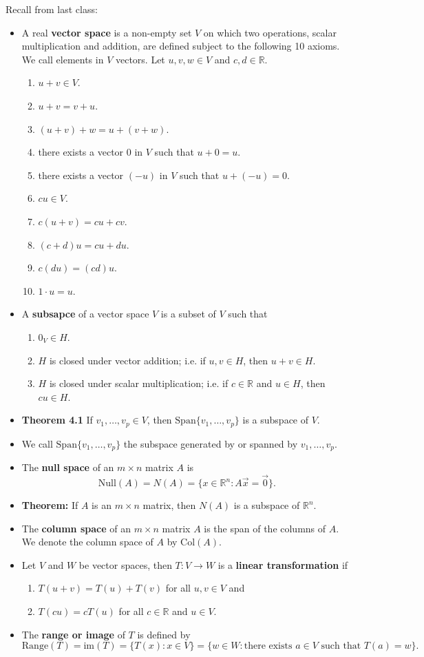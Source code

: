 \documentclass[12pt,letterpaper]{article}
\begin{document}
\thispagestyle{fancy}

Recall from last class:

\begin{itemize}
\item A real {\bf vector space} is a non-empty set $V$ on which two operations, scalar multiplication and addition, are defined subject to the following 10 axioms. We call elements in $V$ vectors. Let $u,v,w \in V$ and $c,d\in \mathbb{R}$.
\begin{enumerate}
\item $u+v \in V$.
\item $u+v=v+u$.
\item $(u+v)+w=u+(v+w)$.
\item there exists a vector $0$ in $V$ such that $u+0=u$.
\item there exists a vector $(-u)$ in $V$ such that $u+(-u)=0$.
\item $cu \in V$.
\item $c(u+v)=cu+cv$.
\item $(c+d)u=cu+du$.
\item $c(du)=(cd)u$.
\item $1\cdot u =u$.
\end{enumerate}
\item A {\bf subsapce} of a vector space $V$ is a subset of $V$ such that
\begin{enumerate}
\item $0_V \in H$.
\item $H$ is closed under vector addition; i.e. if $u, v \in H$, then $u+v \in H$.
\item $H$ is closed under scalar multiplication; i.e. if $c \in \mathbb{R}$ and $u \in H$, then $cu \in H$.
\end{enumerate}
\item {\bf Theorem 4.1} If $v_1, \dots, v_p \in V$, then $\text{Span}\{v_1 ,\dots, v_p\}$ is a subspace of $V$. 
\item We call $\text{Span}\{v_1 ,\dots, v_p\}$ the subspace generated by or spanned by $v_1,\dots, v_p$.
\item 	The {\bf null space} of an $m \times n$ matrix $A$ is $$\text{Null}(A)=N(A)=\{x \in \mathbb{R}^n : A\vec{x}=\vec{0}\}.$$
\item {\bf Theorem:} If $A$ is an $m\times n$ matrix, then $N(A)$ is a subspace of $\mathbb{R}^n$.
\item 	The {\bf column space} of an $m\times n$ matrix $A$ is the span of the columns of $A$. We denote the column space of $A$ by $\text{Col}(A)$.\
\item Let $V$ and $W$ be vector spaces, then $T: V \to W$ is a {\bf linear transformation} if 
\begin{enumerate}
	\item $T(u+v)=T(u)+T(v)$ for all $u, v \in V$ and 
	\item $T(c u)=c T(u)$ for all $c \in \mathbb{R}$ and $u \in V$.
\end{enumerate}
\item 	The {\bf range or image } of $T$ is defined by $$\text{Range}(T)=\text{im}(T)=\{T(x): x \in V\}=\{w\in W: \text{there exists } a \in V \text{ such that } T(a)=w\}.$$ 


\end{itemize}
\end{document}
